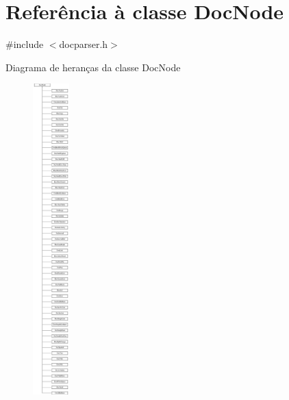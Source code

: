 \hypertarget{class_doc_node}{\section{Referência à classe Doc\-Node}
\label{class_doc_node}
}


{\ttfamily \#include $<$docparser.\-h$>$}

Diagrama de heranças da classe Doc\-Node\begin{figure}[H]
\begin{center}
\leavevmode
\includegraphics[height=12.000000cm]{class_doc_node}
\end{center}
\end{figure}
